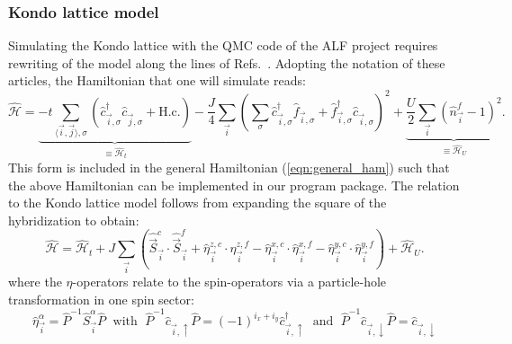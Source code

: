 \documentclass{SciPost}
\begin{document}
\subsubsection{Kondo lattice model}
%
Simulating the Kondo lattice with the QMC code of the ALF project    requires rewriting of the model along the lines of Refs.~\cite{Assaad99a,Capponi00,Beach04}.  
Adopting the notation of these articles,   the Hamiltonian that one will simulate reads: 
 \begin{equation}\label{eqn:ham_kondo}
 	\hat{\mathcal{H}}  = 
	\underbrace{-t \sum_{\langle  \vec{i},\vec{j} \rangle,\sigma} \left( \hat{c}_{\vec{i},\sigma}^{\dagger}  \hat{c}_{\vec{j},\sigma}^{\phantom\dagger}   + \text{H.c.} \right) }_{\equiv \hat{\mathcal{H}}_t} - \frac{J}{4} 
	\sum_{\vec{i}} \left( \sum_{\sigma} \hat{c}_{\vec{i},\sigma}^{\dagger}  \hat{f}_{\vec{i},\sigma}^{\phantom\dagger}  + 
	                                                        \hat{f}_{\vec{i},\sigma}^{\dagger}  \hat{c}_{\vec{i},\sigma}^{\phantom\dagger}   \right)^{2}   +
        \underbrace{\frac{U}{2}   \sum_{\vec{i}}   \left( \hat{n}^{f}_{\vec{i}} -1 \right)^2}_{\equiv \hat{\mathcal{H}}_U}.
 \end{equation}
This form is included in the general Hamiltonian (\ref{eqn:general_ham})  such that the above Hamiltonian can  be implemented in our program package.  
The  relation to the Kondo lattice model follows  from expanding the square  of the hybridization to obtain: 
 \begin{equation}
 	\hat{\mathcal{H}}  =\hat{\mathcal{H}}_t   
	+ J \sum_{\vec{i}}  \left(  \hat{\vec{S}}^{c}_{\vec{i}} \cdot  \hat{\vec{S}}^{f}_{\vec{i}}    +   \hat{\eta}^{z,c}_{\vec{i}} \cdot  \hat{\eta}^{z,f}_{\vec{i}}  
		-  \hat{\eta}^{x,c}_{\vec{i}} \cdot  \hat{\eta}^{x,f}_{\vec{i}}  -  \hat{\eta}^{y,c}_{\vec{i}} \cdot  \hat{\eta}^{y,f}_{\vec{i}} \right) 
	 + \hat{\mathcal{H}}_U.
 \end{equation}
 where the $\eta$-operators  relate to the spin-operators via a particle-hole transformation in one spin sector: 
 \begin{equation} 
 	\hat{\eta}^{\alpha}_{\vec{i}}  = \hat{P}^{-1}  \hat{S}^{\alpha}_{\vec{i}} \hat{P}  	\; \text{ with }  \;   
	\hat{P}^{-1}  \hat{c}^{\phantom\dagger}_{\vec{i},\uparrow} \hat{P}  =   (-1)^{i_x+i_y} \hat{c}^{\dagger}_{\vec{i},\uparrow}  \; \text{ and }  \;   
	\hat{P}^{-1}  \hat{c}^{\phantom\dagger}_{\vec{i},\downarrow} \hat{P}  = \hat{c}^{\phantom\dagger}_{\vec{i},\downarrow} 
 \end{equation}
\end{document}
